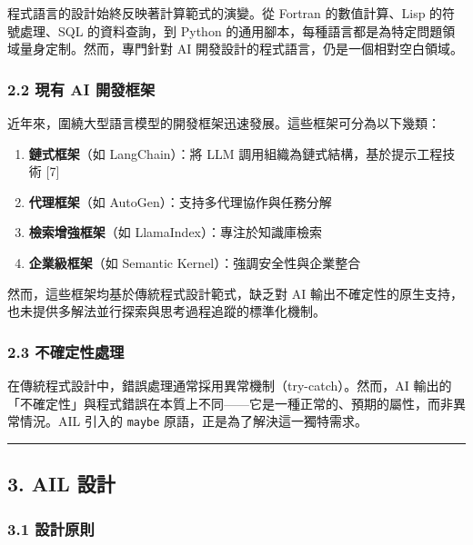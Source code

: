 程式語言的設計始終反映著計算範式的演變。從 Fortran 的數值計算、Lisp
的符號處理、SQL 的資料查詢，到 Python
的通用腳本，每種語言都是為特定問題領域量身定制。然而，專門針對 AI
開發設計的程式語言，仍是一個相對空白領域。

\subsubsection{2.2 現有 AI
開發框架}\label{ux73feux6709-ai-ux958bux767cux6846ux67b6}

近年來，圍繞大型語言模型的開發框架迅速發展。這些框架可分為以下幾類：

\begin{enumerate}
\def\labelenumi{\arabic{enumi}.}
\tightlist
\item
  \textbf{鏈式框架}（如 LangChain）：將 LLM
  調用組織為鏈式結構，基於提示工程技術 {[}7{]}
\item
  \textbf{代理框架}（如 AutoGen）：支持多代理協作與任務分解
\item
  \textbf{檢索增強框架}（如 LlamaIndex）：專注於知識庫檢索
\item
  \textbf{企業級框架}（如 Semantic Kernel）：強調安全性與企業整合
\end{enumerate}

然而，這些框架均基於傳統程式設計範式，缺乏對 AI
輸出不確定性的原生支持，也未提供多解法並行探索與思考過程追蹤的標準化機制。

\subsubsection{2.3
不確定性處理}\label{ux4e0dux78baux5b9aux6027ux8655ux7406}

在傳統程式設計中，錯誤處理通常採用異常機制（try-catch）。然而，AI
輸出的「不確定性」與程式錯誤在本質上不同------它是一種正常的、預期的屬性，而非異常情況。AIL
引入的 \texttt{maybe} 原語，正是為了解決這一獨特需求。

\begin{center}\rule{0.5\linewidth}{0.5pt}\end{center}

\subsection{3. AIL 設計}\label{ail-ux8a2dux8a08}

\subsubsection{3.1 設計原則}\label{ux8a2dux8a08ux539fux5247}

